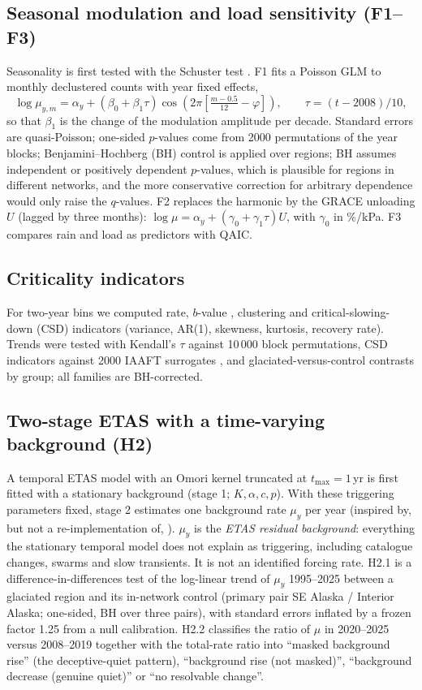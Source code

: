 \documentclass[11pt,a4paper]{article}
\newcommand{\muy}{\mu_y}
\begin{document}
\subsection{Seasonal modulation and load sensitivity (F1--F3)}
Seasonality is first tested with the Schuster test \parencite{ader2013}. F1 fits a Poisson GLM to monthly declustered counts with year fixed effects,
\begin{equation}
\log \mu_{y,m} = \alpha_y + (\beta_0 + \beta_1\tau)\cos\!\left(2\pi\left[\tfrac{m-0.5}{12} - \varphi\right]\right),\qquad \tau=(t-2008)/10,
\end{equation}
so that $\beta_1$ is the change of the modulation amplitude per decade. Standard errors are quasi-Poisson; one-sided $p$-values come from 2000 permutations of the year blocks; Benjamini--Hochberg (BH) control \parencite{benjamini1995} is applied over regions; BH assumes independent or positively dependent $p$-values, which is plausible for regions in different networks, and the more conservative correction for arbitrary dependence would only raise the $q$-values. F2 replaces the harmonic by the GRACE unloading $U$ (lagged by three months): $\log\mu = \alpha_y + (\gamma_0+\gamma_1\tau)U$, with $\gamma_0$ in \%/kPa. F3 compares rain and load as predictors with QAIC.

\subsection{Criticality indicators}
For two-year bins we computed rate, $b$-value \parencite{schorlemmer2005}, clustering and critical-slowing-down (CSD) indicators (variance, AR(1), skewness, kurtosis, recovery rate). Trends were tested with Kendall's $\tau$ against 10\,000 block permutations, CSD indicators against 2000 IAAFT surrogates \parencite{schreiber1996}, and glaciated-versus-control contrasts by group; all families are BH-corrected.

\subsection{Two-stage ETAS with a time-varying background (H2)}
A temporal ETAS model \parencite{ogata1988} with an Omori kernel truncated at $t_\mathrm{max}=1$\,yr is first fitted with a stationary background (stage 1; $K,\alpha,c,p$). With these triggering parameters fixed, stage 2 estimates one background rate $\muy$ per year (inspired by, but not a re-implementation of, \textcite{kumazawa2013}). $\muy$ is the \emph{ETAS residual background}: everything the stationary temporal model does not explain as triggering, including catalogue changes, swarms and slow transients. It is not an identified forcing rate. H2.1 is a difference-in-differences test of the log-linear trend of $\muy$ 1995--2025 between a glaciated region and its in-network control (primary pair SE Alaska / Interior Alaska; one-sided, BH over three pairs), with standard errors inflated by a frozen factor 1.25 from a null calibration. H2.2 classifies the ratio of $\mu$ in 2020--2025 versus 2008--2019 together with the total-rate ratio into ``masked background rise'' (the deceptive-quiet pattern), ``background rise (not masked)'', ``background decrease (genuine quiet)'' or ``no resolvable change''.
\end{document}
